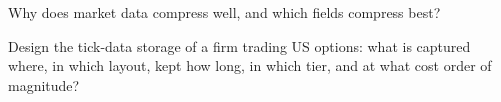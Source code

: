 \begin{interviewq}\label{iq:pl:capturing-and-storing-tick-data:5}
Why does market data compress well, and which fields compress best?
\end{interviewq}

\begin{interviewq}\label{iq:pl:capturing-and-storing-tick-data:6}
Design the tick-data storage of a firm trading US options: what is captured where, in which layout, kept how long, in which
tier, and at what cost order of magnitude?
\end{interviewq}
